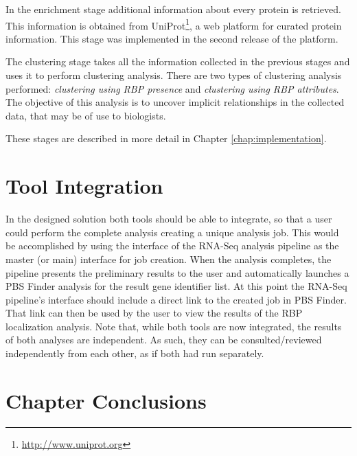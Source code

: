 In the enrichment stage additional information about every protein is retrieved.
This information is obtained from
UniProt\footnote{\url{http://www.uniprot.org}}, a web platform for curated
protein information. This stage was implemented in the second release of the
platform.

The clustering stage takes all the information collected in the previous stages
and uses it to perform clustering analysis. There are two types of clustering
analysis performed: \emph{clustering using RBP presence} and \emph{clustering
using RBP attributes}. The objective of this analysis is to uncover implicit
relationships in the collected data, that may be of use to biologists.

These stages are described in more detail in Chapter \ref{chap:implementation}.

\section{Tool Integration}


In the designed solution both tools should be able to integrate, so that a user
could perform the complete analysis creating a unique analysis job. This would
be accomplished by using the interface of the RNA-Seq analysis pipeline as the
master (or main) interface for job creation. When the analysis completes, the
pipeline presents the preliminary results to the user and automatically launches
a PBS Finder analysis for the result gene identifier list. At this point the
RNA-Seq pipeline's interface should include a direct link to the created job in
PBS Finder. That link can then be used by the user to view the results of the
RBP localization analysis. Note that, while both tools are now integrated, the
results of both analyses are independent. As such, they can be
consulted/reviewed independently from each other, as if both had run separately.

\section{Chapter Conclusions}

